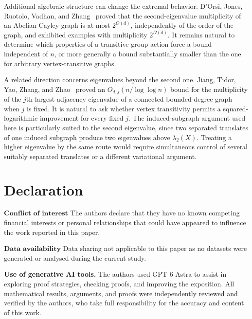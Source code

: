 \documentclass[11pt]{article}
\theoremstyle{definition}
\theoremstyle{remark}
\begin{document}
Additional algebraic structure can change the extremal behavior. D'Orsi, Jones, Ruotolo, Vadhan, and Zhang~\cite{DOrsiJonesRuotoloVadhanZhang2025AbelianCayley} proved that the second-eigenvalue multiplicity of an Abelian Cayley graph is at most $2^{O(d)}$, independently of the order of the graph, and exhibited examples with multiplicity $2^{\Omega(d)}$. It remains natural to determine which properties of a transitive group action force a bound independent of $n$, or more generally a bound substantially smaller than the one for arbitrary vertex-transitive graphs.

A related direction concerns eigenvalues beyond the second one. Jiang, Tidor, Yao, Zhang, and Zhao~\cite[Theorem~2.2]{JiangTidorYaoZhangZhao2021FixedAngle} proved an $O_{d,j}(n/\log\log n)$ bound for the multiplicity of the $j$th largest adjacency eigenvalue of a connected bounded-degree graph when $j$ is fixed. It is natural to ask whether vertex transitivity permits a squared-logarithmic improvement for every fixed $j$. The induced-subgraph argument used here is particularly suited to the second eigenvalue, since two separated translates of one induced subgraph produce two eigenvalues above $\lambda_2(X)$. Treating a higher eigenvalue by the same route would require simultaneous control of several suitably separated translates or a different variational argument.

\section*{Declaration}
\noindent$\textbf{Conflict~of~interest}$
The authors declare that they have no known competing financial interests or personal relationships that could have appeared to influence the work reported in this paper.

\medskip
	
\noindent$\textbf{Data~availability}$
Data sharing not applicable to this paper as no datasets were generated or analysed during the current study.

\medskip

\noindent\textbf{Use of generative AI tools.}
The authors used GPT-6 Astra to assist in exploring proof strategies, checking proofs, and improving the exposition. All mathematical results, arguments, and proofs were independently reviewed and verified by the authors, who take full responsibility for the accuracy and content of this work.
\end{document}
